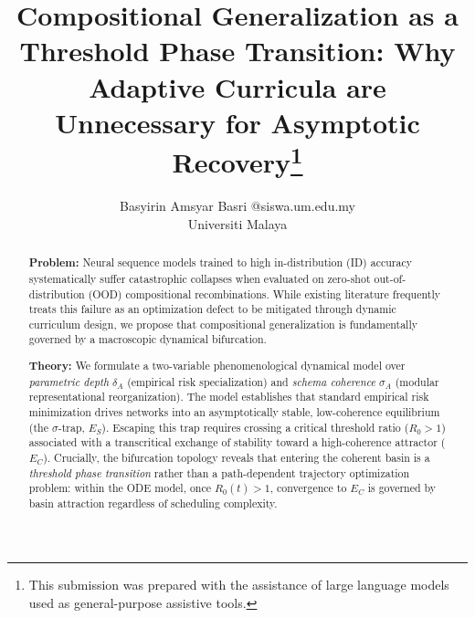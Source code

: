 \documentclass{article}
\title{Compositional Generalization as a Threshold Phase Transition: Why Adaptive Curricula are Unnecessary for Asymptotic Recovery\thanks{This submission was prepared with the assistance of large language models used as general-purpose assistive tools.}}
\author{\name Basyirin Amsyar Basri \email 26001270@siswa.um.edu.my \\
        \addr Universiti Malaya}
\date{}
\theoremstyle{definition}
\begin{document}
\maketitle

\begin{abstract}
\textbf{Problem:} Neural sequence models trained to high in-distribution (ID) accuracy systematically suffer catastrophic collapses when evaluated on zero-shot out-of-distribution (OOD) compositional recombinations. While existing literature frequently treats this failure as an optimization defect to be mitigated through dynamic curriculum design, we propose that compositional generalization is fundamentally governed by a macroscopic dynamical bifurcation.

\textbf{Theory:} We formulate a two-variable phenomenological dynamical model over \emph{parametric depth} $\delta_A$ (empirical risk specialization) and \emph{schema coherence} $\sigma_A$ (modular representational reorganization). The model establishes that standard empirical risk minimization drives networks into an asymptotically stable, low-coherence equilibrium (the $\sigma$-trap, $E_S$). Escaping this trap requires crossing a critical threshold ratio ($R_0 > 1$) associated with a transcritical exchange of stability toward a high-coherence attractor ($E_C$). Crucially, the bifurcation topology reveals that entering the coherent basin is a \emph{threshold phase transition} rather than a path-dependent trajectory optimization problem: within the ODE model, once $R_0(t) > 1$, convergence to $E_C$ is governed by basin attraction regardless of scheduling complexity.


\end{abstract}
\end{document}
